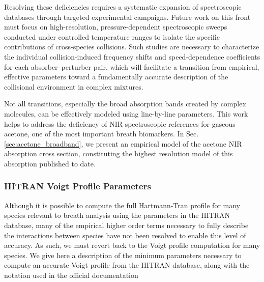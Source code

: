 \documentclass[8pt,a4paper]{report}
\begin{document}
	Resolving these deficiencies requires a systematic expansion of spectroscopic databases through targeted experimental campaigns. Future work on this front must focus on high-resolution, pressure-dependent spectroscopic sweeps conducted under controlled temperature ranges to isolate the specific contributions of cross-species collisions. Such studies are necessary to characterize the individual collision-induced frequency shifts and speed-dependence coefficients for each absorber–perturber pair, which will facilitate a transition from empirical, effective parameters toward a fundamentally accurate description of the collisional environment in complex mixtures.
	
	Not all transitions, especially the broad absorption bands created by complex molecules, can be effectively modeled using line-by-line parameters. This work helps to address the deficiency of NIR spectroscopic references for gaseous acetone, one of the most important breath biomarkers. In Sec. \ref{sec:acetone_broadband}, we present an empirical model of the acetone NIR absorption cross section, constituting the highest resolution model of this absorption published to date.
	
	\subsubsection{HITRAN Voigt Profile Parameters}
	Although it is possible to compute the full Hartmann-Tran profile for many species relevant to breath analysis using the parameters in the HITRAN database, many of the empirical higher order terms necessary to fully describe the interactions between species have not been resolved to enable this level of accuracy. As such, we must revert back to the Voigt profile computation for many species. We give here a description of the minimum parameters necessary to compute an accurate Voigt profile from the HITRAN database, along with the notation used in the official documentation
	
\end{document}
